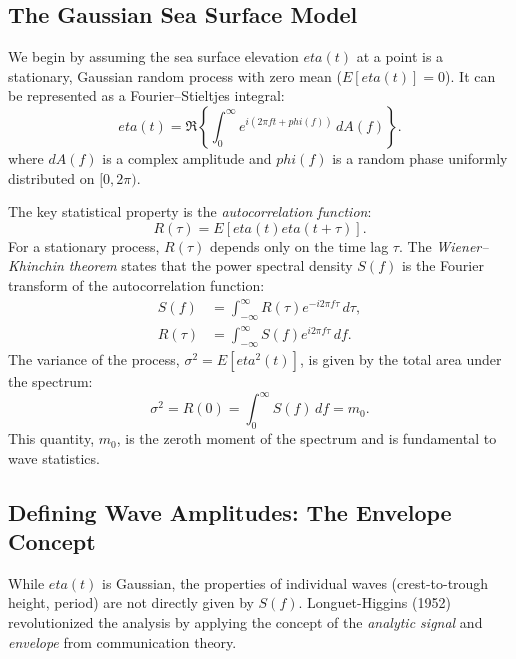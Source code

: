 \documentclass[journal,10pt,twocolumn]{IEEEtran}
\def\eta{eta}%
\def\phi{phi}%
\begin{document}
    \subsection{The Gaussian Sea Surface Model}
    We begin by assuming the sea surface elevation $\eta(t)$ at a point is a stationary, Gaussian random process with zero mean ($E[\eta(t)] = 0$). It can be represented as a Fourier--Stieltjes integral:
    \begin{equation}
        \eta(t) = \Re \left\{ \int_{0}^{\infty} e^{i(2\pi ft + \phi(f))}\, dA(f) \right\}.
    \end{equation}
    where $dA(f)$ is a complex amplitude and $\phi(f)$ is a random phase uniformly distributed on $[0,2\pi)$.

    The key statistical property is the \textit{autocorrelation function}:
    \begin{equation}
        R(\tau) = E[\eta(t)\eta(t+\tau)].
    \end{equation}
    For a stationary process, $R(\tau)$ depends only on the time lag $\tau$. The \textit{Wiener--Khinchin theorem} states that the power spectral density $S(f)$ is the Fourier transform of the autocorrelation function:
    \begin{align}
        S(f) &= \int_{-\infty}^{\infty} R(\tau)e^{-i2\pi f\tau}\, d\tau,\\
        R(\tau) &= \int_{-\infty}^{\infty} S(f)e^{i2\pi f\tau}\, df.
    \end{align}
    The variance of the process, $\sigma^2 = E[\eta^2(t)]$, is given by the total area under the spectrum:
    \begin{equation}
        \sigma^2 = R(0) = \int_{0}^{\infty} S(f)\, df = m_0.
    \end{equation}
    This quantity, $m_0$, is the zeroth moment of the spectrum and is fundamental to wave statistics.

    \subsection{Defining Wave Amplitudes: The Envelope Concept}
    \label{sec:envelope}
    While $\eta(t)$ is Gaussian, the properties of individual waves (crest-to-trough height, period) are not directly given by $S(f)$. Longuet-Higgins (1952) revolutionized the analysis by applying the concept of the \textit{analytic signal} and \textit{envelope} from communication theory.
\end{document}
